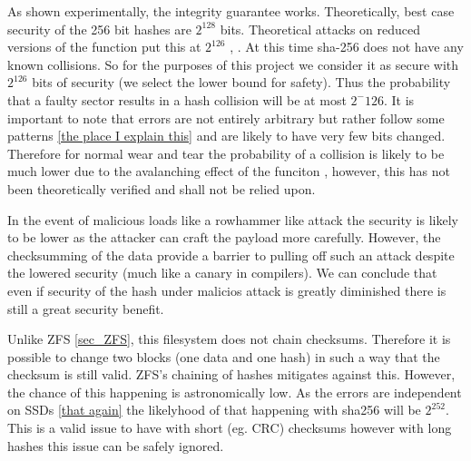         As shown experimentally, the integrity guarantee works. Theoretically,
        best case security of the 256 bit hashes are $2^128$ bits. Theoretical
        attacks on reduced versions of the function put this at $2^126$
        \cite{sha2_security}, \cite{https://eprint.iacr.org/2016/374.pdf}. At
        this time sha-256 does not have any known collisions. So for the
        purposes of this project we consider it as secure with $2^126$ bits of
        security (we select the lower bound for safety).  Thus the probability
        that a faulty sector results in a hash collision will be at most
        $2^-126$. It is important to note that errors are not entirely
        arbitrary but rather follow some patterns \ref{the place I explain
        this} and are likely to have very few bits changed. Therefore for
        normal wear and tear the probability of a collision is likely to be
        much lower due to the avalanching effect of the funciton \cite{one of
        the above?}, however, this has not been theoretically verified and
        shall not be relied upon.

        In the event of malicious loads like a rowhammer like attack
        \cite{https://www.usenix.org/system/files/conference/woot17/woot17-paper-kurmus.pdf}
        the security is likely to be lower as the attacker can craft the
        payload more carefully. However, the checksumming of the data provide a
        barrier to pulling off such an attack despite the lowered security
        (much like a canary in compilers). We can conclude that even if
        security of the hash under malicios attack is greatly diminished there
        is still a great security benefit.

        Unlike ZFS \ref{sec_ZFS}, this filesystem does not chain checksums.
        Therefore it is possible to change two blocks (one data and one hash)
        in such a way that the checksum is still valid. ZFS's chaining of
        hashes mitigates against this. However, the chance of this happening is
        astronomically low. As the errors are independent on SSDs \ref{that
        again} the likelyhood of that happening with sha256 will be $2^252$.
        This is a valid issue to have with short (eg. CRC) checksums however
        with long hashes this issue can be safely ignored.

